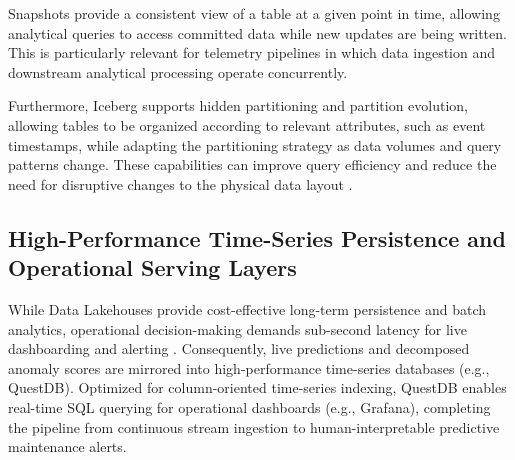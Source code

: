 Snapshots provide a consistent view of a table at a given point in time, allowing analytical queries to access committed data while new updates are being written.
This is particularly relevant for telemetry pipelines in which data ingestion and downstream analytical processing operate concurrently.

Furthermore, Iceberg supports hidden partitioning and partition evolution, allowing tables to be organized according to relevant attributes, such as event timestamps, while adapting the partitioning strategy as data volumes and query patterns change.
These capabilities can improve query efficiency and reduce the need for disruptive changes to the physical data layout \cite{icebergIncremental2026}.

\subsection{High-Performance Time-Series Persistence and Operational Serving Layers}

While Data Lakehouses provide cost-effective long-term persistence and batch analytics, operational decision-making demands sub-second latency for live dashboarding and alerting \cite{mohna2024medallion}.
Consequently, live predictions and decomposed anomaly scores are mirrored into high-performance time-series databases (e.g., QuestDB).
Optimized for column-oriented time-series indexing, QuestDB enables real-time SQL querying for operational dashboards (e.g., Grafana), completing the pipeline from continuous stream ingestion to human-interpretable predictive maintenance alerts.
